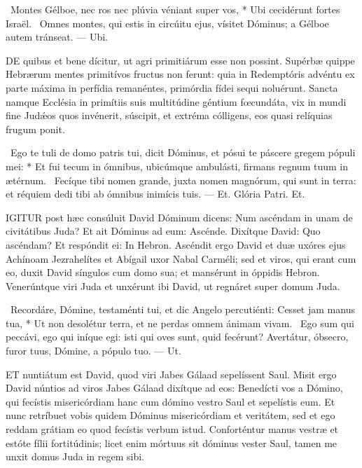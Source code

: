 \R\ Montes Gélboe, nec ros nec plúvia véniant super vos, * Ubi cecidérunt fortes Israël. \V\ Omnes montes, qui estis in circúitu ejus, vísitet Dóminus; a Gélboe autem tránseat. --- Ubi.


\lettrine[lines=2]{D}{E} quibus et bene dícitur, ut agri primitiárum esse non possint. Supérbæ quippe Hebrærum mentes primitívos fructus non ferunt: quia in Redemptóris advéntu ex parte máxima in perfídia remanéntes, primórdia fídei sequi noluérunt. Sancta namque Ecclésia in primítiis suis multitúdine géntium fœcundáta, vix in mundi fine Judǽos quos invénerit, súscipit, et extréma cólligens, eos quasi relíquias frugum ponit.

\R\ Ego te tuli de domo patris tui, dicit Dóminus, et pósui te páscere gregem pópuli mei: * Et fui tecum in ómnibus, ubicúmque ambulásti, firmans regnum tuum in ætérnum. \V\ Fecíque tibi nomen grande, juxta nomen magnórum, qui sunt in terra: et réquiem dedi tibi ab ómnibus inimícis tuis. --- Et. Glória Patri. Et.





\lettrine[lines=2]{I}{GITUR} post hæc consúluit David Dóminum dicens: Num ascéndam in unam de civitátibus Juda? Et ait Dóminus ad eum: Ascénde. Dixítque David: Quo ascéndam? Et respóndit ei: In Hebron. Ascéndit ergo David et duæ uxóres ejus Achínoam Jezrahelítes et Abígail uxor Nabal Carméli; sed et viros, qui erant cum eo, duxit David síngulos cum domo sua; et mansérunt in óppidis Hebron. Venerúntque viri Juda et unxérunt ibi David, ut regnáret super domum Juda.

\R\ Recordáre, Dómine, testaménti tui, et dic Angelo percutiénti: Cesset jam manus tua, * Ut non desolétur terra, et ne perdas omnem ánimam vivam. \V\ Ego sum qui peccávi, ego qui iníque egi: isti qui oves sunt, quid fecérunt? Avertátur, óbsecro, furor tuus, Dómine, a pópulo tuo. --- Ut.


\lettrine[lines=2]{E}{T} nuntiátum est David, quod viri Jabes Gálaad sepelíssent Saul. Misit ergo David núntios ad viros Jabes Gálaad dixítque ad eos: Benedícti vos a Dómino, qui fecístis misericórdiam hanc cum dómino vestro Saul et sepelístis eum. Et nunc retríbuet vobis quidem Dóminus misericórdiam et veritátem, sed et ego reddam grátiam eo quod fecístis verbum istud. Conforténtur manus vestræ et estóte fílii fortitúdinis; licet enim mórtuus sit dóminus vester Saul, tamen me unxit domus Juda in regem sibi.

